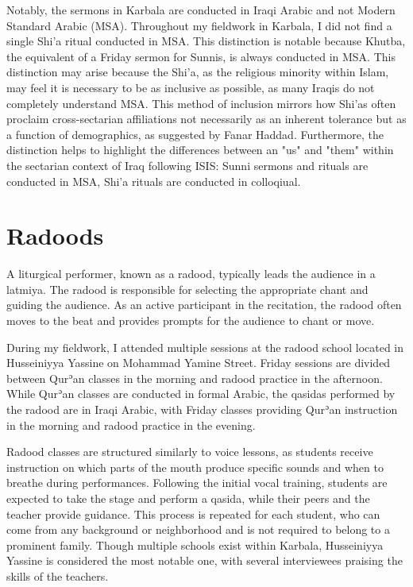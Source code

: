 Notably, the sermons in Karbala are conducted in Iraqi Arabic and not Modern Standard Arabic (MSA). Throughout my fieldwork in Karbala, I did not find a single Shi'a ritual conducted in MSA. This distinction is notable because Khutba, the equivalent of a Friday sermon for Sunnis, is always conducted in MSA. This distinction may arise because the Shi'a, as the religious minority within Islam, may feel it is necessary to be as inclusive as possible, as many Iraqis do not completely understand MSA. This method of inclusion mirrors how Shi'as often proclaim cross-sectarian affiliations not necessarily as an inherent tolerance but as a function of demographics, as suggested by Fanar Haddad\cite[183]{haddad_understanding_2020}. Furthermore, the distinction helps to highlight the differences between an "us" and "them" within the sectarian context of Iraq following ISIS: Sunni sermons and rituals are conducted in MSA, Shi'a rituals are conducted in colloqiual.

\section{Radoods}
A liturgical performer, known as a radood, typically leads the audience in a latmiya. The radood is responsible for selecting the appropriate chant and guiding the audience. As an active participant in the recitation, the radood often moves to the beat and provides prompts for the audience to chant or move.

During my fieldwork, I attended multiple sessions at the radood school located in Husseiniyya Yassine on Mohammad Yamine Street. Friday sessions are divided between Qurʾan classes in the morning and radood practice in the afternoon. While Qurʾan classes are conducted in formal Arabic, the qasidas performed by the radood are in Iraqi Arabic, with Friday classes providing Qurʾan instruction in the morning and radood practice in the evening.

Radood classes are structured similarly to voice lessons, as students receive instruction on which parts of the mouth produce specific sounds and when to breathe during performances. Following the initial vocal training, students are expected to take the stage and perform a qasida, while their peers and the teacher provide guidance. This process is repeated for each student, who can come from any background or neighborhood and is not required to belong to a prominent family. Though multiple schools exist within Karbala, Husseiniyya Yassine is considered the most notable one, with several interviewees praising the skills of the teachers.

